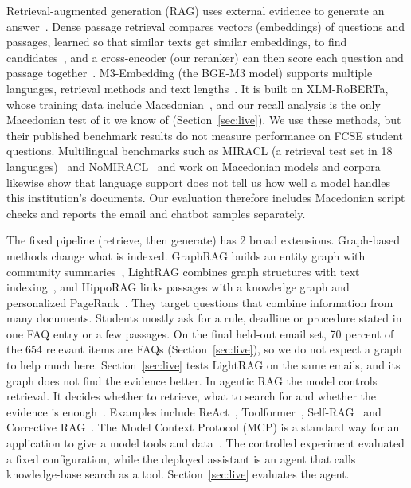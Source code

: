 Retrieval-augmented generation (RAG) uses external evidence to generate an answer~\cite{lewis2020rag}. Dense passage retrieval compares vectors (embeddings) of questions and passages, learned so that similar texts get similar embeddings, to find candidates~\cite{karpukhin2020dpr}, and a cross-encoder (our reranker) can then score each question and passage together~\cite{nogueira2019bertrerank}. M3-Embedding (the BGE-M3 model) supports multiple languages, retrieval methods and text lengths~\cite{chen2024m3}. It is built on XLM-RoBERTa, whose training data include Macedonian~\cite{conneau2020xlmr}, and our recall analysis is the only Macedonian test of it we know of (Section~\ref{sec:live}). We use these methods, but their published benchmark results do not measure performance on FCSE student questions. Multilingual benchmarks such as MIRACL (a retrieval test set in 18 languages)~\cite{zhang2023miracl} and NoMIRACL~\cite{thakur2024nomiracl} and work on Macedonian models and corpora~\cite{krsteski2025macedonian} likewise show that language support does not tell us how well a model handles this institution's documents. Our evaluation therefore includes Macedonian script checks and reports the email and chatbot samples separately.

The fixed pipeline (retrieve, then generate) has 2 broad extensions. Graph-based methods change what is indexed. GraphRAG builds an entity graph with community summaries~\cite{edge2024graphrag}, LightRAG combines graph structures with text indexing~\cite{guo2024lightrag}, and HippoRAG links passages with a knowledge graph and personalized PageRank~\cite{gutierrez2024hipporag}. They target questions that combine information from many documents. Students mostly ask for a rule, deadline or procedure stated in one FAQ entry or a few passages. On the final held-out email set, 70 percent of the 654 relevant items are FAQs (Section~\ref{sec:live}), so we do not expect a graph to help much here. Section~\ref{sec:live} tests LightRAG on the same emails, and its graph does not find the evidence better. In agentic RAG the model controls retrieval. It decides whether to retrieve, what to search for and whether the evidence is enough~\cite{singh2025agenticrag}. Examples include ReAct~\cite{yao2023react}, Toolformer~\cite{schick2023toolformer}, Self-RAG~\cite{asai2024selfrag} and Corrective RAG~\cite{yan2024crag}. The Model Context Protocol (MCP) is a standard way for an application to give a model tools and data~\cite{anthropic2024mcp}. The controlled experiment evaluated a fixed configuration, while the deployed assistant is an agent that calls knowledge-base search as a tool. Section~\ref{sec:live} evaluates the agent.

